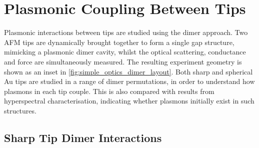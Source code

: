 \documentclass[a4paper]{article}
\begin{document}
\section{Plasmonic Coupling Between Tips}


Plasmonic interactions between tips are studied using the dimer approach. Two AFM tips are dynamically brought together to form a single gap structure, mimicking a plasmonic dimer cavity, whilst the optical scattering, conductance and force are simultaneously measured. The resulting experiment geometry is shown as an inset in \autoref{fig:simple_optics_dimer_layout}. Both sharp and spherical Au tips are studied in a range of dimer permutations, in order to understand how plasmons in each tip couple. This is also compared with results from hyperspectral characterisation, indicating whether plasmons initially exist in such structures.

\subsection{Sharp Tip Dimer Interactions}
\end{document}
